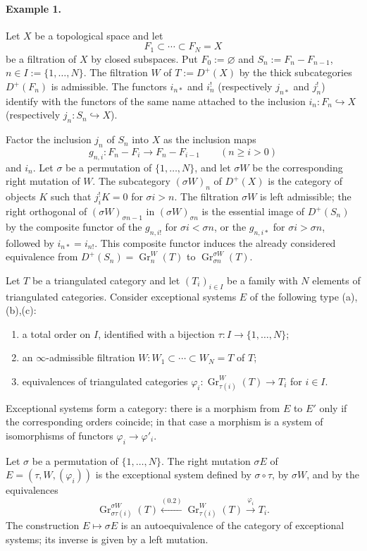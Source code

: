 \documentclass[11pt]{article}
\newcommand{\Gr}{\operatorname{Gr}}
\begin{document}
\paragraph{Example 1.} Let $X$ be a topological space and let
\[
 F_1\subset\cdots\subset F_N=X
\]
be a filtration of $X$ by closed subspaces. Put $F_0:=\varnothing$ and $S_n:=F_n-F_{n-1}$, $n\in I:=\{1,\ldots,N\}$. The filtration $W$ of $T:=D^+(X)$ by the thick subcategories $D^+(F_n)$ is admissible. The functors $i_{n*}$ and $i_n^!$ (respectively $j_{n*}$ and $j_n^!$) identify with the functors of the same name attached to the inclusion $i_n:F_n\hookrightarrow X$ (respectively $j_n:S_n\hookrightarrow X$).

Factor the inclusion $j_n$ of $S_n$ into $X$ as the inclusion maps
\[
 g_{n,i}:F_n-F_i\longrightarrow F_n-F_{i-1}\qquad(n\geq i>0)
\]
and $i_n$. Let $\sigma$ be a permutation of $\{1,\ldots,N\}$, and let $\sigma W$ be the corresponding right mutation of $W$. The subcategory $(\sigma W)_n$ of $D^+(X)$ is the category of objects $K$ such that $j_i^!K=0$ for $\sigma i>n$. The filtration $\sigma W$ is left admissible; the right orthogonal of $(\sigma W)_{\sigma n-1}$ in $(\sigma W)_{\sigma n}$ is the essential image of $D^+(S_n)$ by the composite functor of the $g_{n,i!}$ for $\sigma i<\sigma n$, or the $g_{n,i*}$ for $\sigma i>\sigma n$, followed by $i_{n*}=i_{n!}$. This composite functor induces the already considered equivalence from $D^+(S_n)=\Gr^W_n(T)$ to $\Gr^{\sigma W}_{\sigma n}(T)$.

Let $T$ be a triangulated category and let $(T_i)_{i\in I}$ be a family with $N$ elements of triangulated categories. Consider exceptional systems $E$ of the following type (a),(b),(c):
\begin{enumerate}[label=(\alph*)]
\item a total order on $I$, identified with a bijection $\tau:I\to\{1,\ldots,N\}$;
\item an $\infty$-admissible filtration $W:W_1\subset\cdots\subset W_N=T$ of $T$;
\item equivalences of triangulated categories $\varphi_i:\Gr^W_{\tau(i)}(T)\to T_i$ for $i\in I$.
\end{enumerate}
Exceptional systems form a category: there is a morphism from $E$ to $E'$ only if the corresponding orders coincide; in that case a morphism is a system of isomorphisms of functors $\varphi_i\to\varphi'_i$.

Let $\sigma$ be a permutation of $\{1,\ldots,N\}$. The right mutation $\sigma E$ of $E=(\tau,W,(\varphi_i))$ is the exceptional system defined by $\sigma\circ\tau$, by $\sigma W$, and by the equivalences
\[
 \Gr^{\sigma W}_{\sigma\tau(i)}(T) \xleftarrow{(0.2)} \Gr^W_{\tau(i)}(T) \xrightarrow{\varphi_i} T_i.
\]
The construction $E\mapsto\sigma E$ is an autoequivalence of the category of exceptional systems; its inverse is given by a left mutation.
\end{document}
